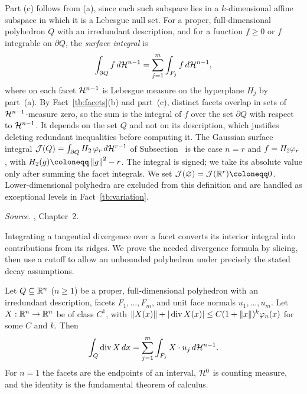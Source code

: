 Part (c) follows from (a), since each such subspace lies in a
\(k\)-dimensional affine subspace in which it is a Lebesgue null set. For a
proper, full-dimensional polyhedron \(Q\) with an irredundant description,
and for a function \(f\ge0\) or \(f\) integrable on \(\partial Q\), the
\emph{surface integral} is
\[
 \int_{\partial Q}f\,d\mathcal H^{n-1}=\sum_{j=1}^m\int_{F_j}f\,d\mathcal H^{n-1},
\]
where on each facet \(\mathcal H^{n-1}\) is Lebesgue measure on the hyperplane
\(H_j\) by part~(a). By Fact~\ref{tb:facets}(b) and part~(c), distinct
facets overlap in sets of \(\mathcal H^{n-1}\)-measure zero, so the sum is the
integral of \(f\) over the set \(\partial Q\) with respect to
\(\mathcal H^{n-1}\). It depends on the set \(Q\) and not on its description,
which justifies deleting redundant inequalities before computing it.
The Gaussian surface integral \(\mathcal J(Q)=\int_{\partial Q}H_2\,\varphi_r\,
d\mathcal H^{r-1}\) of Subsection~ is the case
\(n=r\) and \(f=H_2\varphi_r\), with \(\Hh(g)\coloneqq \norm g^2-r\).
The integral is signed; we take its absolute value only after summing
the facet integrals. We set \(\surf(\varnothing)=\surf(\R^r)\coloneqq0\).
Lower-dimensional polyhedra are excluded from this definition and are
handled as exceptional levels in Fact~\ref{tb:variation}.

\emph{Source.} , Chapter~2.

Integrating a tangential divergence over a facet converts its interior
integral into contributions from its ridges. We prove the needed divergence
formula by slicing, then use a cutoff to allow an unbounded polyhedron
under precisely the stated decay assumptions.

\begin{samepage}
\begin{fact}\label{tb:divergence}
Let \(Q\subseteq\mathbb R^n\) (\(n\ge1\)) be a proper, full-dimensional polyhedron
with an irredundant description, facets \(F_1,\ldots,F_m\), and unit
face normals \(u_1,\ldots,u_m\). Let \(X:\mathbb R^n\to\mathbb R^n\) be of class \(C^1\), with
\(\left\lVert X(x)\right\rVert+|\operatorname{div}X(x)|\le C(1+\left\lVert x\right\rVert)^k\varphi_n(x)\) for
some \(C\) and \(k\). Then
\[
 \int_Q\operatorname{div}X\,dx=\sum_{j=1}^m\int_{F_j}X\cdot u_j\,d\mathcal H^{n-1}.
\]
For \(n=1\) the facets are the endpoints of an interval, \(\mathcal H^0\) is
counting measure, and the identity is the fundamental theorem of calculus.
\end{fact}
\end{samepage}

